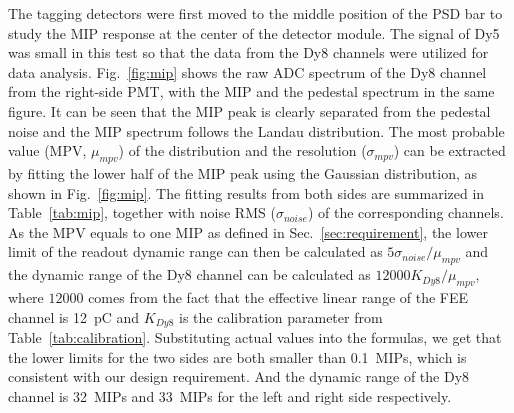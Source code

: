 \documentclass[preprint, times]{elsarticle}
\begin{document}
The tagging detectors were first moved to the middle position of the PSD bar to study the MIP response at the center of the detector module.
The signal of Dy5 was small in this test so that the data from the Dy8 channels were utilized for data analysis.
Fig.~\ref{fig:mip} shows the raw ADC spectrum of the Dy8 channel from the right-side PMT, with the MIP and the pedestal spectrum in the same figure.
It can be seen that the MIP peak is clearly separated from the pedestal noise and the MIP spectrum follows the Landau distribution.
The most probable value (MPV, $\mu_{mpv}$) of the distribution and the resolution ($\sigma_{mpv}$) can be extracted by fitting the lower half of the MIP peak using the Gaussian distribution, as shown in Fig.~\ref{fig:mip}.
The fitting results from both sides are summarized in Table~\ref{tab:mip}, together with noise RMS ($\sigma_{noise}$) of the corresponding channels.
As the MPV equals to one MIP as defined in Sec.~\ref{sec:requirement}, the lower limit of the readout dynamic range can then be calculated as $5\sigma_{noise}/\mu_{mpv}$ and the dynamic range of the Dy8 channel can be calculated as $12000K_{Dy8}/\mu_{mpv}$, where $12000$ comes from the fact that the effective linear range of the FEE channel is \SI{12}{\pico\coulomb} and $K_{Dy8}$ is the calibration parameter from Table~\ref{tab:calibration}.
Substituting actual values into the formulas, we get that the lower limits for the two sides are both smaller than \SI{0.1}{MIPs}, which is consistent with our design requirement. 
And the dynamic range of the Dy8 channel is \SI{32}{MIPs} and \SI{33}{MIPs} for the left and right side respectively.

\end{document}
